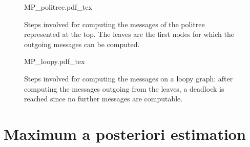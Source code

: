 \begin{figure*}
	\centering
\def\svgwidth{0.9 \textwidth}
{MP_politree.pdf_tex}
	\caption{Steps involved for computing the messages of the politree represented at the top. The leaves are the first nodes for which the outgoing messages can be computed.}
	\label{fig:00:politree_MP}
\end{figure*} 

\begin{figure*}
	\centering
\def\svgwidth{0.35 \textwidth}
{MP_loopy.pdf_tex}
	\caption{Steps involved for computing the messages on a loopy graph: after computing the messages outgoing from the leaves, a deadlock is reached since no further messages are computable.}
	\label{fig:00:loopy_MP}
\end{figure*} 


\section{Maximum a posteriori estimation}
\label{sec:00:MAP}

